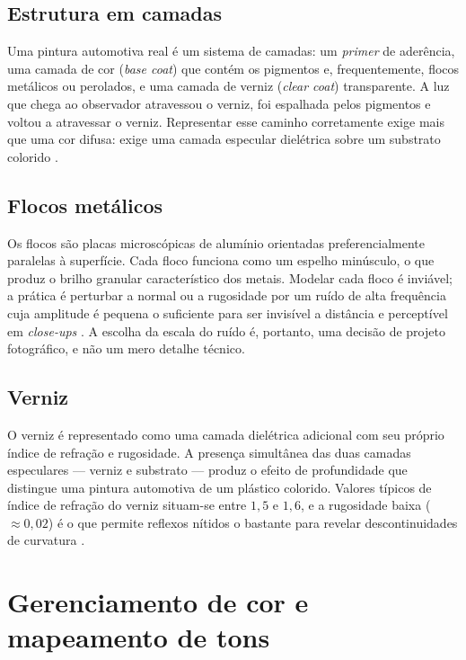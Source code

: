 \subsection{Estrutura em camadas}

Uma pintura automotiva real \'e um sistema de camadas: um \emph{primer} de ader\^encia, uma
camada de cor (\emph{base coat}) que cont\'em os pigmentos e, frequentemente, flocos
met\'alicos ou perolados, e uma camada de verniz (\emph{clear coat}) transparente. A luz que
chega ao observador atravessou o verniz, foi espalhada pelos pigmentos e voltou a atravessar o
verniz. Representar esse caminho corretamente exige mais que uma cor difusa: exige uma camada
especular diel\'etrica sobre um substrato colorido \cite{karis2013, burley2012}.

\subsection{Flocos met\'alicos}

Os flocos s\~ao placas microsc\'opicas de alum\'inio orientadas preferencialmente paralelas \`a
superf\'icie. Cada floco funciona como um espelho min\'usculo, o que produz o brilho granular
caracter\'istico dos metais. Modelar cada floco \'e invi\'avel; a pr\'atica \'e perturbar a
normal ou a rugosidade por um ru\'ido de alta frequ\^encia cuja amplitude \'e pequena o
suficiente para ser invis\'ivel a dist\^ancia e percept\'ivel em \emph{close-ups}
\cite{karis2013}. A escolha da escala do ru\'ido \'e, portanto, uma decis\~ao de projeto
fotogr\'afico, e n\~ao um mero detalhe t\'ecnico.

\subsection{Verniz}

O verniz \'e representado como uma camada diel\'etrica adicional com seu pr\'oprio \'indice de
refra\c{c}\~ao e rugosidade. A presen\c{c}a simult\^anea das duas camadas especulares --- verniz
e substrato --- produz o efeito de profundidade que distingue uma pintura automotiva de um
pl\'astico colorido. Valores t\'ipicos de \'indice de refra\c{c}\~ao do verniz situam-se entre
$1,5$ e $1,6$, e a rugosidade baixa ($\approx 0,02$) \'e o que permite reflexos n\'itidos o
bastante para revelar descontinuidades de curvatura \cite{karis2013}.

\section{Gerenciamento de cor e mapeamento de tons}

